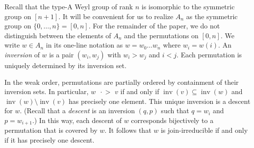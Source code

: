 \documentclass[ALCO,ThmDefs,Unicode,epreuves]{cedram}
\DeclareMathOperator{\inv}{inv}
\newcommand{\covers}{{\,\,\,\cdot\!\!\!\! >\,\,}}
\renewcommand{\1}{\hat{1}}
\newcommand{\0}{\hat{0}}
\newcommand{\newword}[1]{\emph{#1}}
\begin{document}
Recall that the type-A Weyl group of rank $n$ is isomorphic to the symmetric group on $[n+1]$.
It will be convenient for us to realize $A_n$ as the symmetric group on $\{0,\ldots,n\}= [0,n]$.
For the remainder of the paper, we do not distinguish between the elements of $A_n$ and the permutations on $[0,n]$.
We write $w\in A_{n}$ in its one-line notation as $w= w_0\ldots w_{n}$ where $w_i=w(i)$.
An \newword{inversion} of $w$ is a pair $(w_i,w_j)$ with $w_i>w_j$ and $i<j$.
Each permutation is uniquely determined by its inversion set.

In the weak order, permutations are partially ordered by containment of their inversion sets.
In particular, $w\covers v$ if and only if $\inv(v) \subseteq \inv(w)$ and $\inv(w) \setminus \inv(v)$ has precisely one element.
This unique inversion is a descent for $w$.
(Recall that a \newword{descent} is an inversion $(q,p)$ such that $q=w_{i}$ and $p=w_{i+1}$.)
In this way, each descent of $w$ corresponds bijectively to a permutation that is covered by $w$.
It follows that $w$ is join-irreducible if and only if it has precisely one descent.
\end{document}
